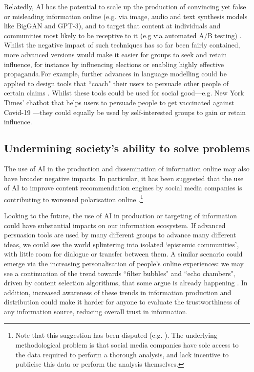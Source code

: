 \documentclass{article}
\begin{document}
Relatedly, AI has the potential to scale up the production of convincing yet false or misleading information online (e.g. via image, audio and text synthesis models like BigGAN and GPT-3), and to target that content at individuals and communities most likely to be receptive to it (e.g via automated A/B testing) \citep{seger_tackling_2020}. Whilst the negative impact of such techniques has so far been fairly contained, more advanced versions would make it easier for groups to seek and retain influence, for instance by influencing elections or enabling highly effective propaganda.For example, further advances in language modelling could be applied to design tools that ``coach" their users to persuade other people of certain claims \citep{kokotajlo_persuasion_2020}. Whilst these tools could be used for social good---e.g. New York Times’ chatbot that helps users to persuade people to get vaccinated against Covid-19 \citep{gagneur_opinion_2021}---they could equally be used by self-interested groups to gain or retain influence.

\subsection{Undermining society’s ability to solve problems}

The use of AI in the production and dissemination of information online may also have broader negative impacts. In particular, it has been suggested that the use of AI to improve content recommendation engines by social media companies is contributing to worsened polarisation online \citep{ribeiro_auditing_2019,faddoul_longitudinal_2020}.\footnote{ Note that this suggestion has been disputed (e.g. \citealt{ledwich_algorithmic_2019,boxell_greater_2017}). The underlying methodological problem is that social media companies have sole access to the data required to perform a thorough analysis, and lack incentive to publicise this data or perform the analysis themselves.} 


Looking to the future, the use of AI in production or targeting of information could have substantial impacts on our information ecosystem. If advanced persuasion tools are used by many different groups to advance many different ideas, we could see the world splintering into isolated ‘epistemic communities’, with little room for dialogue or transfer between them. A similar scenario could emerge via the increasing personalisation of people’s online experiences: we may see a continuation of the trend towards ``filter bubbles" and ``echo chambers", driven by content selection algorithms, that some argue is already happening \citep{barbera_tweeting_2015,flaxman_filter_2016,nguyen_exploring_2014}. In addition, increased awareness of these trends in information production and distribution could make it harder for anyone to evaluate the trustworthiness of any information source, reducing overall trust in information.
\end{document}
